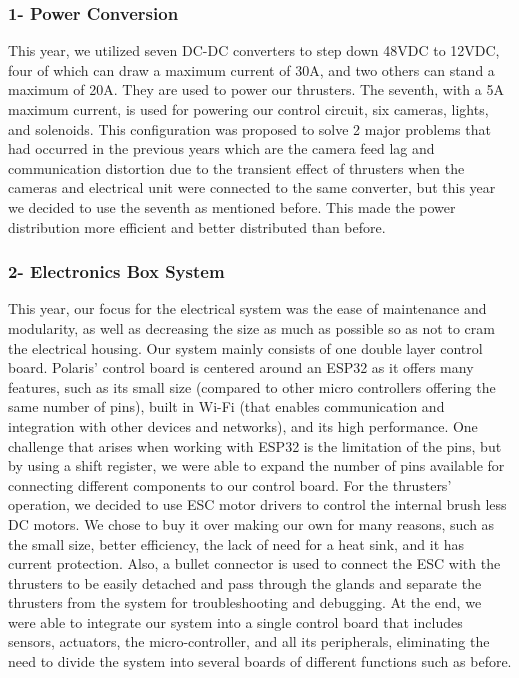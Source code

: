 \documentclass[a4paper,12pt,leqno]{report}
\begin{document}
\textcolor{orange!90}{
	\subsubsection{1- Power Conversion }}
This year, we utilized seven DC-DC converters to step down 48VDC to 12VDC, four of which can draw a maximum current of 30A, and two others can stand a maximum of 20A. They are  used to power our thrusters. The seventh, with a 5A maximum current, is used for powering our  control circuit, six cameras, lights, and solenoids. This configuration was proposed to solve 2  major problems that had occurred in the previous years which are the camera feed lag and  communication distortion due to the transient effect of thrusters when the cameras and electrical  unit were connected to the same converter, but this year we decided to use the seventh as mentioned before. This made the power distribution more efficient and better distributed than  before.\\
\textcolor{orange!90}{
	\subsubsection{2- Electronics Box System}}
This year, our focus for the electrical system was the ease of maintenance  
and modularity, as well as decreasing the size as much as possible so as not to cram the electrical housing. Our system mainly consists of one double layer control board. Polaris’ control board is centered around an ESP32 as it offers many features, such as its small size (compared to other micro controllers offering the same number of pins), built in Wi-Fi (that enables communication and integration with other devices and networks), and its high performance.
One challenge that arises when working with ESP32 is the limitation of  the pins, but by using a shift register, we were able to expand the number  of pins available for connecting different components to our control board. 
For the thrusters’ operation, we decided to use ESC motor drivers to  control the internal brush less DC motors. We chose to buy it over making  our own for many reasons, such as the small size, better efficiency, the  lack of need for a heat sink, and it has current protection. Also, a bullet  connector is used to connect the ESC with the thrusters to be easily  detached and pass through the glands and separate the thrusters from  the system for troubleshooting and debugging.
At the end, we were able to integrate our system into a single control  board that includes sensors, actuators, the micro-controller, and all its  peripherals, eliminating the need to divide the system into several boards  of different functions such as before. \\
\end{document}
